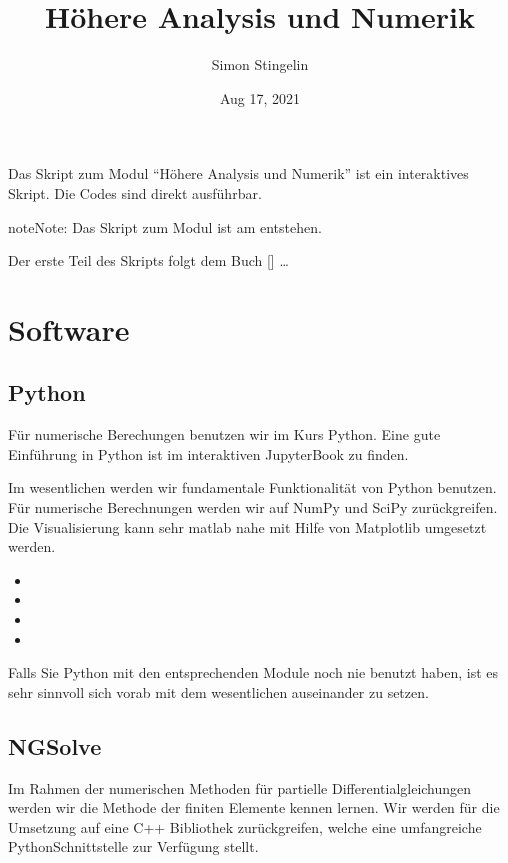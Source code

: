 \documentclass[letterpaper,10pt,english]{jupyterBook}
\title{Höhere Analysis und Numerik}
\date{Aug 17, 2021}
\author{Simon Stingelin}
\begin{document}
\pagestyle{empty}
\sphinxmaketitle
\pagestyle{plain}
\sphinxtableofcontents
\pagestyle{normal}
\label{\detokenize{intro::doc}}


Das Skript zum Modul “Höhere Analysis und Numerik” ist ein interaktives Skript. Die Codes sind direkt ausführbar.

\begin{sphinxadmonition}{note}{Note:}
Das Skript zum Modul ist am entstehen.
\end{sphinxadmonition}

Der erste Teil des Skripts folgt dem Buch {[}{]} …


\part{Software}


\chapter{Python}
\label{\detokenize{Software/Python:python}}\label{\detokenize{Software/Python::doc}}
Für numerische Berechungen benutzen wir im Kurs Python. Eine gute Einführung in Python ist im interaktiven Jupyter\sphinxhyphen{}Book  zu finden.

Im wesentlichen werden wir fundamentale Funktionalität von Python benutzen. Für numerische Berechnungen werden wir auf NumPy und SciPy zurückgreifen. Die Visualisierung kann sehr matlab nahe mit Hilfe von Matplotlib umgesetzt werden.
\begin{itemize}
\item {} 

\item {} 

\item {} 

\item {} 

\end{itemize}

Falls Sie Python mit den entsprechenden Module noch nie benutzt haben, ist es sehr sinnvoll sich vorab mit dem wesentlichen auseinander zu setzen.


\chapter{NGSolve}
\label{\detokenize{Software/NGSolve:ngsolve}}\label{\detokenize{Software/NGSolve::doc}}
Im Rahmen der numerischen Methoden für partielle Differentialgleichungen werden wir die Methode der finiten Elemente kennen lernen. Wir werden für die Umsetzung auf eine C++ Bibliothek  zurückgreifen, welche eine umfangreiche Python\sphinxhyphen{}Schnittstelle zur Verfügung stellt.
\end{document}
